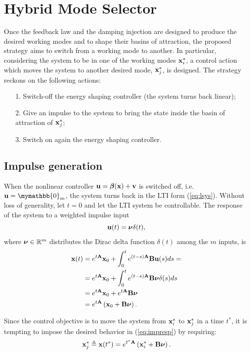 \section{Hybrid Mode Selector}
%
Once the feedback law and the damping injection are designed to produce the desired working modes and to shape their basins of attraction, the proposed strategy aims to switch from a working mode to another.
In particular, considering the system to be in one of the working modes $\mathbf{x}_i^*$, a control action which moves the system to another desired mode, $\mathbf{x}_j^*$, is designed.
The strategy reckons on the following actions:
\begin{itemize}
    \item [1.] Switch-off the energy shaping controller (the system turns back linear);
    \item [2.] Give an impulse to the system to bring the state inside the basin of attraction of $\mathbf{x}_j^*$;
    \item [3.] Switch on again the energy shaping controller.
\end{itemize}
%
\subsection{Impulse generation}
When the nonlinear controller $\mathbf{u}=\bm\beta(\mathbf{x})+\mathbf{v}$ is switched off, i.e. $\ub=\mymathbb{0}_m$, the system turns back in the LTI form (\ref{eq:lsys}).
Without loss of generality, let $t = 0$ and let the LTI system be controllable. The response of the system to a weighted impulse input 
%
\begin{equation}
\mathbf{u}(t) = \bm\nu\delta(t),
\end{equation}
%
where $\bm\nu\in\mathbb{R}^m$ distributes the Dirac delta function $\delta(t)$ among the $m$ inputs,
is
%
\begin{align}\label{eq:impresp}
    \mathbf{x}(t) &= e^{t\mathbf{A}}\mathbf{x}_0 + \int_0^te^{(t-s)\mathbf{A}}\mathbf{B} \mathbf{u}(s)ds =\nonumber\\
    &= e^{t\mathbf{A}}\mathbf{x}_0 + \int_0^te^{(t-s)\mathbf{A}}\mathbf{B}\bm\nu\delta(s)ds \nonumber\\
    &= e^{t\mathbf{A}}\mathbf{x}_0 + e^{t\mathbf{A}}\mathbf{B}\bm\nu\\
    &= e^{t\mathbf{A}}\left(\mathbf{x}_0 + \mathbf{B}\bm\nu\right) .
\end{align}
%

Since the control objective is to move the system from $\mathbf{x}_i^*$ to $\mathbf{x}_j^*$ in a time $t^*$, it is tempting to impose the desired behavior in (\ref{eq:impresp}) by requiring:
%
\begin{equation}\label{eq:cond}
    \mathbf{x}_j^* \triangleq \mathbf{x}(t^*) = e^{t^*\mathbf{A}}\left(\mathbf{x}_i^* + \mathbf{B}\bm\nu\right).
\end{equation}
%

